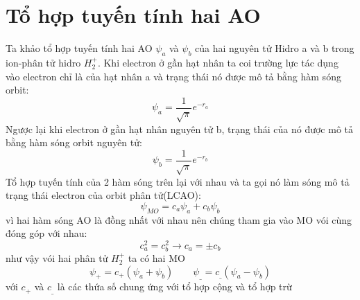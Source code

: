 \section{Tổ hợp tuyến tính hai AO}
Ta khảo tổ hợp tuyến tính hai AO $\psi_a$ và $\psi_b$ của hai nguyên tử Hidro a và b trong ion-phân tử hidro $H^+_2$. Khi electron ở gần hạt nhân ta coi trường lực tác dụng vào electron chỉ là của hạt nhân a và trạng thái nó được mô tả bằng hàm sóng orbit:
\begin{equation}
\psi_a=\frac{1}{\sqrt{\pi}}e^{-r_a}
\end{equation}
Ngược lại khi electron ở gần hạt nhân nguyên tử b, trạng thái của nó được mô tả bằng hàm sóng orbit nguyên tử:
\begin{equation}
\psi_b=\frac{1}{\sqrt{\pi}}e^{-r_b}
\end{equation}
Tổ hợp tuyến tính của 2 hàm sóng trên lại với nhau và ta gọi nó làm sóng mô tả trạng thái electron của orbit phân tử(LCAO):
\begin{equation}
\psi_{MO}=c_a\psi_a + c_b\psi_b
\end{equation}
vì hai hàm sóng AO là đồng nhất với nhau nên chúng tham gia vào MO vói cùng đóng góp với nhau:
\begin{equation}
c^2_a=c^2_b \rightarrow c_a=\pm c_b
\end{equation}
như vậy vói hai phân tử $H^+_2$ ta có hai MO
\begin{equation}
 \psi_+ = c_+\left(\psi_a + \psi_b \right)  \qquad \psi_{\_}=c_{\_}\left(\psi_a -\psi_b\right)
\end{equation}
với $c_+$ và $c_\_$ là các thứa số chung ứng với tổ hợp cộng và tổ hợp trừ 
